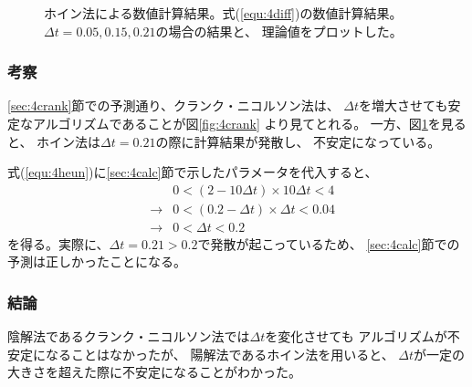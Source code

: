 \documentclass[a4j, titlepage]{jsarticle}
\numberwithin{equation}{section}
\begin{document}
\begin{figure}[h]
\begin{minipage}{0.49\hsize}
                    \caption{
                        ホイン法による数値計算結果。式(\ref{equ:4diff})の数値計算結果。
                        $\Delta t = 0.05, 0.15, 0.21$の場合の結果と、
                        理論値をプロットした。
                    }
                    \label{fig:4heun}
                \end{minipage}
            \end{figure}

        \subsubsection{考察}
            \ref{sec:4crank}節での予測通り、クランク・ニコルソン法は、
            $\Delta t$を増大させても安定なアルゴリズムであることが図\ref{fig:4crank}
            より見てとれる。
            一方、図\ref{fig:4heun}を見ると、
            ホイン法は$\Delta t=0.21$の際に計算結果が発散し、
            不安定になっている。

            式(\ref{equ:4heun})に\ref{sec:4calc}節で示したパラメータを代入すると、
            \begin{eqnarray*}
                && 0 < (2 - 10\Delta t)\times 10\Delta t < 4 \\
                &\rightarrow& 0 < (0.2 - \Delta t)\times \Delta t < 0.04 \\
                &\rightarrow& 0 < \Delta t < 0.2
            \end{eqnarray*}
            を得る。実際に、$\Delta t = 0.21 > 0.2$で発散が起こっているため、
            \ref{sec:4calc}節での予測は正しかったことになる。

        \subsubsection{結論}
            陰解法であるクランク・ニコルソン法では$\Delta t$を変化させても
            アルゴリズムが不安定になることはなかったが、
            陽解法であるホイン法を用いると、
            $\Delta t$が一定の大きさを超えた際に不安定になることがわかった。
\end{document}
